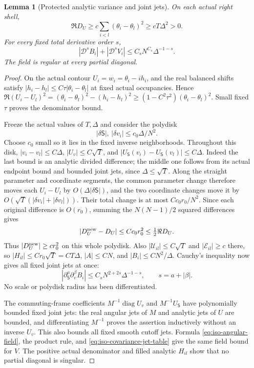 \documentclass[11pt]{article}
\numberwithin{equation}{section}
\newtheorem{lemma}[theorem]{Lemma}
\theoremstyle{definition}
\begin{document}
\begin{lemma}[Protected analytic variance and joint jets]
\label{lem:iso-covariance-jets}
On each actual right shell,
\begin{equation}\label{eq:iso-covariance-lower}
 \Re D_U\ge c\sum_{i<l}(\theta_i-\theta_l)^2
                   \ge cT\Delta^2>0.
\end{equation}
For every fixed total derivative order $s$,
\begin{equation}\label{eq:iso-field-jets}
 |\mathcal D^s B_i|+|\mathcal D^s V_i|
       \le C_sN^{C_s}\Delta^{-1-s}.
\end{equation}
The field is regular at every partial diagonal.
\end{lemma}
\begin{proof}
On the actual contour $U_i=w_i=\theta_i-ih_i$, and the real
balanced shifts satisfy
$|h_i-h_l|\le C\tau|\theta_i-\theta_l|$ at fixed actual occupancies.
Hence
$\Re(U_i-U_l)^2=(\theta_i-\theta_l)^2-(h_i-h_l)^2
 \ge(1-C^2\tau^2)(\theta_i-\theta_l)^2$.
Small fixed $\tau$ proves the denominator bound.

Freeze the actual values of $T,\Delta$ and consider the polydisk
\[
 |\delta\mathsf S|,\ |\delta v_i|\le c_0\Delta/N^2.
\]
Choose $c_0$ small so it lies in the fixed inverse neighborhoods.
Throughout this disk, $|v_i-v_l|\le C\Delta$,
$|U_v|\le C\sqrt T$, and
$|U_{\mathsf S}(v_i)-U_{\mathsf S}(v_l)|\le C\Delta$.
Indeed the last bound is an analytic divided difference; the middle
one follows from its actual endpoint bound and bounded joint jets,
since $\Delta\le\sqrt T$.
Along the straight parameter and coordinate segments, the common
parameter change therefore moves each $U_i-U_l$ by $O(\Delta
|\delta\mathsf S|)$, and the two coordinate changes move it by
$O(\sqrt T(|\delta v_i|+|\delta v_l|))$.
Their total change is at most $Cc_0r_0/N^2$.
Since each original difference is $O(r_0)$, summing the $N(N-1)/2$
squared differences gives
\[
 |D_U^{\rm new}-D_U|\le Cc_0r_0^2\le\tfrac12\Re D_U.
\]
Thus $|D_U^{\rm new}|\ge cr_0^2$ on this whole polydisk.
Also $|\mathcal U_{il}|\le C\sqrt T$ and
$|\mathcal E_{il}|\ge c$ there, so
$|H_{il}|\le Cr_0\sqrt T=CT\Delta$, $|A|\le CN$, and
$|B_i|\le CN^2/\Delta$.
Cauchy's inequality now gives all fixed joint jets at once:
\begin{equation}\label{eq:iso-covariance-jet-table}
 |\partial_{\mathsf S}^a\partial_v^\beta B_i|
 \le C_sN^{2+2s}\Delta^{-1-s},\qquad s=a+|\beta|.
\end{equation}
No scale or polydisk radius has been differentiated.

The commuting-frame coefficients
$M^{-1}\operatorname{diag}U_v$ and $M^{-1}U_{\mathsf S}$ have
polynomially bounded fixed joint jets: the real angular jets of
$M$ and analytic jets of $U$ are bounded, and differentiating
$M^{-1}$ proves the assertion inductively without an inverse $U_v$.
This also bounds all fixed smooth cutoff jets.
Formula \eqref{eq:iso-angular-field}, the product rule, and
\eqref{eq:iso-covariance-jet-table} give the same field bound for $V$.
The positive actual denominator and filled analytic $H_{il}$ show
that no partial diagonal is singular.
\end{proof}
\end{document}
